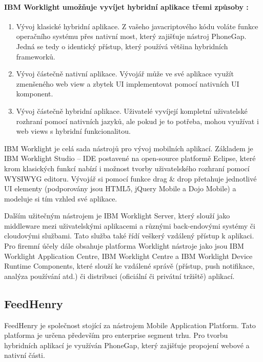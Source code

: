 \paragraph{IBM Worklight umožňuje vyvíjet hybridní aplikace třemi způsoby \cite{ibm_worklight_overview}:}
\begin{enumerate}
	\item Vývoj klasické hybridní aplikace. Z vašeho javacriptového kódu voláte funkce operačního systému přes nativní most, který zajišťuje nástroj PhoneGap. Jedná se tedy o identický přístup, který používá většina hybridních frameworků.
	\item Vývoj částečně nativní aplikace. Vývojář může ve své aplikace využít zmenšeného web view a zbytek UI implementovat pomocí nativních UI komponent.
	\item Vývoj částečně hybridní aplikace. Uživatelé vyvíjejí kompletní uživatelské rozhraní pomocí nativních jazyků, ale pokud je to potřeba, mohou využívat i web views s hybridní funkcionalitou.
\end{enumerate}

IBM Worklight je celá sada nástrojů pro vývoj mobilních aplikací. Základem je IBM Worklight Studio – IDE postavené na open-source platformě Eclipse, které krom klasických funkcí nabízí i možnost tvorby uživatelského rozhraní pomocí WYSIWYG editoru. Vývojář si pomocí funkce drag \& drop přetahuje jednotlivé UI elementy (podporovány jsou HTML5, jQuery Mobile a Dojo Mobile) a modeluje si tím vzhled své aplikace.

Dalším užitečným nástrojem je IBM Worklight Server, který slouží jako middleware mezi uživatelskými aplikacemi a různými back-endovými systémy či cloudovými službami. Tato služba také řídí veškerý vzdálený přístup k aplikaci. Pro firemní účely dále obsahuje platforma Worklight nástroje jako jsou  IBM Worklight Application Centre, IBM Worklight Centre a IBM Worklight Device Runtime Components, které slouží ke vzdálené správě (přístup, push notifikace, analýza používání atd.) či distribuci (oficiální či privátní tržiště) aplikací.

\subsection{FeedHenry}
FeedHenry je společnost stojící za nástrojem Mobile Application Platform. Tato platforma je určena především pro enterprise segment trhu. Pro tvorbu hybridních aplikací je využíván PhoneGap, který zajišťuje propojení webové a nativní části.

